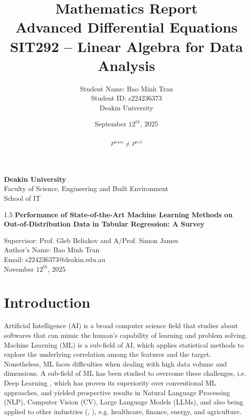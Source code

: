 \documentclass[12pt,a4paper]{article}
\title{\textbf{Mathematics Report  \\ Advanced Differential Equations}\\[6pt]
       \large {SIT292 – Linear Algebra for Data Analysis}}
\author{Student Name: Bao Minh Tran \\
 Student ID: s224236373 \\
  Deakin University}
\date{September $12^{th}$, 2025}
\theoremstyle{definition}
\theoremstyle{remark}
\begin{document}
\begin{titlepage}
    \centering
    \vspace*{2cm}

    {\Large \textbf{Deakin University}}\\[0.5cm]
    {\large Faculty of Science, Engineering and Built Environment}\\[0.5cm]
    {\large School of IT}\\[2.5cm]

    \begin{spacing}{1.5}
    {\LARGE \textbf{Performance of State-of-the-Art Machine Learning Methods on Out-of-Distribution Data in Tabular Regression: A Survey}}\\[3cm]
    \end{spacing}
    \vspace{0cm}

    {\Large Supervisor: Prof. Gleb Beliakov and A/Prof. Simon James}\\[3cm]

    {\large Author's Name: Bao Minh Tran}\\[0.5cm]
    {\large Email: s224236373@deakin.edu.au}\\[2cm]


    {\large November $12^{th}$, 2025}

    \vfill
\end{titlepage}

\setcounter{tocdepth}{2}
\tableofcontents
\newpage

\begin{abstract}

\[
P^{train} \neq P^{test}
\]

\end{abstract}

\section{Introduction}
Artificial Intelligence (AI) \cite{8697857} is a broad computer science field that studies about softwares that can mimic the human's capability of learning and problem solving.
Machine Learning (ML) is a sub-field of AI, which \cite{Janiesch_2021} applies statistical methods to explore the underlying correlation among the features and the target.
Nonetheless, ML faces difficulties when dealing with high data volume and dimensions. A sub-field of ML has been studied to overcome these challenges, i.e. Deep Learning \cite{lecun2015deep},
which has proven its superiority over conventional ML approaches, and yielded prospective results in Natural Language Processing (NLP), Computer Vision (CV), Large Language Models (LLMs),
and also being applied to other industries (\cite{rane2024applications}, \cite{jordan2015machine}), e.g. healthcare, finance, energy, and agriculture.
\\
\end{document}
